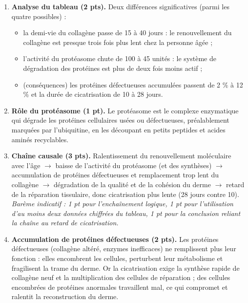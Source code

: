 \documentclass[11pt]{article}
\begin{document}
\begin{corrige}
\begin{enumerate}
\item \textbf{Analyse du tableau (2 pts).} Deux différences significatives (parmi les quatre possibles) :
\begin{itemize}
\item la demi-vie du collagène passe de 15 à 40 jours : le renouvellement du collagène est presque trois fois plus lent chez la personne âgée ;
\item l'activité du protéasome chute de 100 à 45 unités : le système de dégradation des protéines est plus de deux fois moins actif ;
\item (conséquences) les protéines défectueuses accumulées passent de 2 \% à 12 \% et la durée de cicatrisation de 10 à 28 jours.
\end{itemize}

\item \textbf{Rôle du protéasome (1 pt).} Le protéasome est le complexe enzymatique qui dégrade les protéines cellulaires usées ou défectueuses, préalablement marquées par l'ubiquitine, en les découpant en petits peptides et acides aminés recyclables.

\item \textbf{Chaîne causale (3 pts).}
Ralentissement du renouvellement moléculaire avec l'âge $\rightarrow$ baisse de l'activité du protéasome (et des synthèses) $\rightarrow$ accumulation de protéines défectueuses et remplacement trop lent du collagène $\rightarrow$ dégradation de la qualité et de la cohésion du derme $\rightarrow$ retard de la réparation tissulaire, donc cicatrisation plus lente (28 jours contre 10).
\emph{Barème indicatif : 1 pt pour l'enchaînement logique, 1 pt pour l'utilisation d'au moins deux données chiffrées du tableau, 1 pt pour la conclusion reliant la chaîne au retard de cicatrisation.}

\item \textbf{Accumulation de protéines défectueuses (2 pts).} Les protéines défectueuses (collagène altéré, enzymes inefficaces) ne remplissent plus leur fonction : elles encombrent les cellules, perturbent leur métabolisme et fragilisent la trame du derme. Or la cicatrisation exige la synthèse rapide de collagène neuf et la multiplication des cellules de réparation ; des cellules encombrées de protéines anormales travaillent mal, ce qui compromet et ralentit la reconstruction du derme.


\end{enumerate}
\end{corrige}
\end{document}
